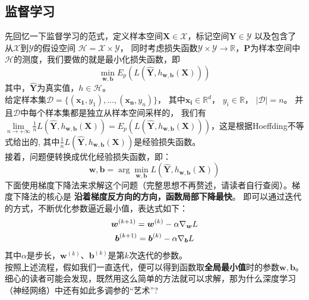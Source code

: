 \documentclass[12pt,a4paper]{ctexart}
\numberwithin{equation}{section}%
\numberwithin{figure}{section}%
\begin{document}
\subsection{监督学习}
先回忆一下监督学习的范式，定义样本空间$\boldsymbol{X} \in \mathcal{X}$，标记空间$ \boldsymbol{Y} \in \mathcal{Y}$
以及包含了从$\mathcal{X}$到$\mathcal{Y}$的假设空间 $\mathcal{H}=\mathcal{X} \times \mathcal{Y}$，
同时考虑损失函数$\mathcal{Y} \times \mathcal{Y} \rightarrow \mathbb{R}$，$\boldsymbol{P}$为样本空间中$\mathcal{H}$的测度，我们要做的就是最小化损失函数，即
\begin{equation}
\min \limits_{\boldsymbol{w,b}}E_p({L(\boldsymbol{\hat{Y}},h_{\boldsymbol{w,b}}(\boldsymbol{X}))})
\end{equation}
其中，$\boldsymbol{\hat{Y}}$为真实值，$h \in \mathcal{H}$。\\
给定样本集$\mathcal{D}=\{(\boldsymbol{x_1},y_1),\ldots,(\boldsymbol{x_n},y_n)\}$，
其中$\boldsymbol{x_i} \in \mathbb{R}^d$， $y_i \in \mathbb{R}$， $ |\mathcal{D}|=n$。
并且$\mathcal{D}$中每个样本集都是独立从样本空间采样的，
我们有$\lim \limits_{n \rightarrow + \infty} \frac{1}{n} {L(\boldsymbol{\hat{Y}},h_{\boldsymbol{w,b}}(\boldsymbol{X}))}= E_p({L(\boldsymbol{\hat{Y}},h_{\boldsymbol{w,b}}(\boldsymbol{X}))})$，这是根据Hoeffding不等式给出的,
其中$\frac{1}{n} {L(\boldsymbol{\hat{Y}},h_{\boldsymbol{w,b}}(\boldsymbol{X}))}$是经验损失函数。\\
接着，问题便转换成优化经验损失函数，即：
\begin{equation}
    \boldsymbol{w,b}=\arg\min \limits_{\boldsymbol{w,b}}{L(\boldsymbol{\hat{Y}},h_{\boldsymbol{w,b}}(\boldsymbol{X}))}
\end{equation}
下面使用梯度下降法来求解这个问题（完整思想不再赘述，请读者自行查阅）。梯度下降法的核心是 \textbf{沿着梯度反方向的方向，函数局部下降最快}。
即可以通过迭代的方式，不断优化参数逼近最小值，表达式如下：
\begin{gather}
    \boldsymbol{w}^{(k+1)}=\boldsymbol{w}^{(k)}- \alpha \nabla_{\boldsymbol{w}} L \notag \\
    \boldsymbol{b}^{(k+1)}=\boldsymbol{b}^{(k)}- \alpha \nabla_{\boldsymbol{b}} L \label{tiduxiajiang}
\end{gather}
其中$\alpha$是步长，$\boldsymbol{w}^{(k)}$、$\boldsymbol{b}^{(k)}$是第$k$次迭代的参数。\\
按照上述流程，假如我们一直迭代，便可以得到函数取\textbf{全局最小值}时的参数$\boldsymbol{w,b}$。
细心的读者可能会发现，既然用这么简单的方法就可以求解，那为什么深度学习（神经网络）中还有如此多调参的“艺术”? \\
\end{document}
